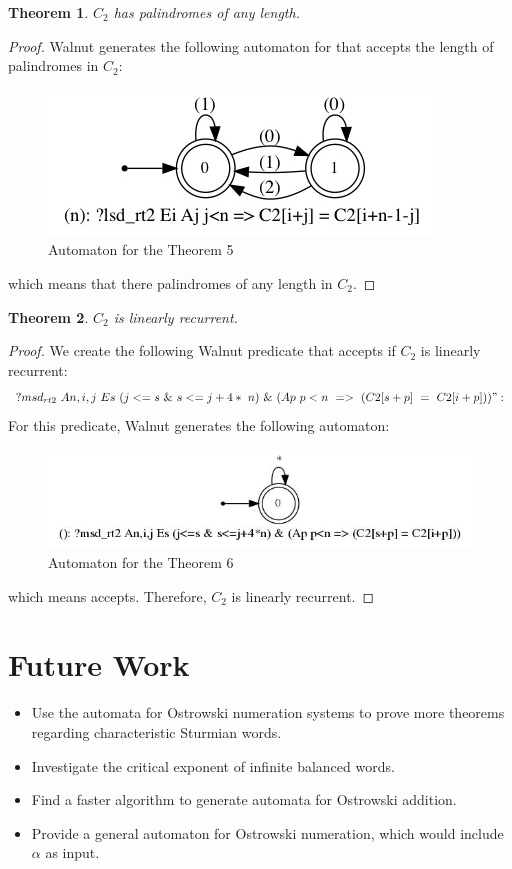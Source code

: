 \documentclass[a4paper]{article}
\newtheorem{theorem}{Theorem}
\begin{document}
\begin{theorem} \textbf{$C_2$} \textit{has palindromes of any length.}
\end{theorem}

\begin{proof}
Walnut generates the following automaton for that accepts the length of palindromes in $C_2$:

\begin{figure}[h]
\centering
\includegraphics[width=0.5\columnwidth]{theorem12_gv_copy.jpg}
	\vspace*{-5mm}
    \caption{Automaton for the Theorem 5} 
    \label{fig:Theorem}
\end{figure}

which means that there palindromes of any length in $C_2$.
\end{proof}
\newpage
\begin{theorem} \textbf{$C_2$} \textit{is linearly recurrent.}
\end{theorem}

\begin{proof}
We create the following Walnut predicate that accepts if $C_2$ is linearly recurrent:
$$?msd_{rt2} ~An,i,j ~Es ~(j<=s ~\& ~s<=j+4\ast ~n) ~\& ~(Ap ~p<n ~=> ~(C2[s+p] ~= ~C2[i+p]))":$$
For this predicate, Walnut generates the following automaton:

\begin{figure}[h]
\centering
\includegraphics[width=0.7\columnwidth]{theorem23_6_gv.jpg}
    \caption{Automaton for the Theorem 6}
    \label{fig:Theorem}
\end{figure}

which means accepts. Therefore, $C_2$ is linearly recurrent.
\end{proof}
\section{Future Work}
\begin{itemize}
\item Use the automata for Ostrowski numeration systems to prove more theorems regarding characteristic Sturmian words.
\item Investigate the critical exponent of infinite balanced words.
\item Find a faster algorithm to generate automata for Ostrowski addition.
\item Provide a general automaton for Ostrowski numeration, which would include $\alpha$ as input.
\end{itemize}
\end{document}
